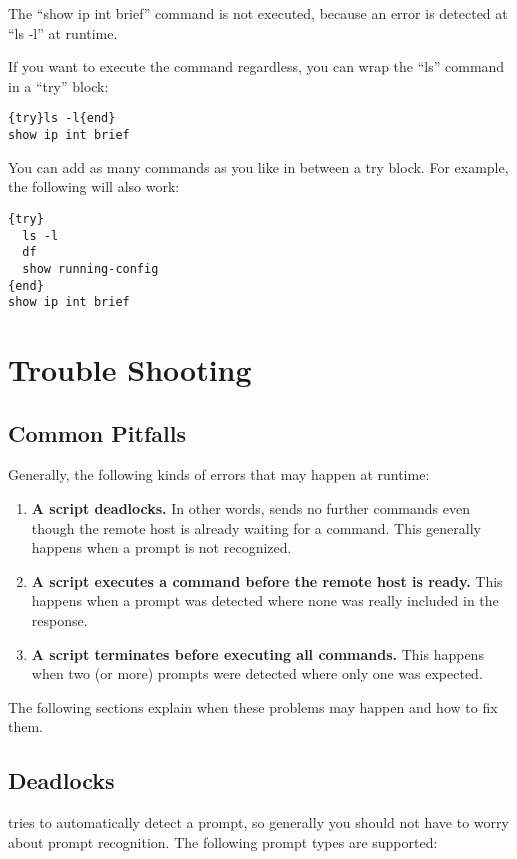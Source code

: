 The ``show ip int brief'' command is not executed, because an error is 
detected at ``ls -l'' at runtime.

If you want to execute the command regardless, you can wrap the ``ls'' 
command in a ``try'' block: 

\begin{lstlisting}
{try}ls -l{end}
show ip int brief
\end{lstlisting}

You can add as many commands as you like in between a try block. For 
example, the following will also work: 

\begin{lstlisting}
{try}
  ls -l
  df
  show running-config
{end}
show ip int brief
\end{lstlisting}


\section{Trouble Shooting}
\subsection{Common Pitfalls}

Generally, the following kinds of errors that may happen at runtime:

\begin{enumerate}
\item {\bf A script deadlocks.} In other words, \product sends no further 
commands even though the remote host is already waiting for a command. 
This generally happens when a prompt is not recognized. 
\item {\bf A script executes a command before the remote host is ready.} 
This happens when a prompt was detected where none was really included 
in the response. 
\item {\bf A script terminates before executing all commands.} This 
happens when two (or more) prompts were detected where only one was 
expected. 
\end{enumerate}

The following sections explain when these problems may happen and how to fix them. 

\subsection{Deadlocks}

\product tries to automatically detect a prompt, so generally you should 
not have to worry about prompt recognition. The following prompt types 
are supported: 

